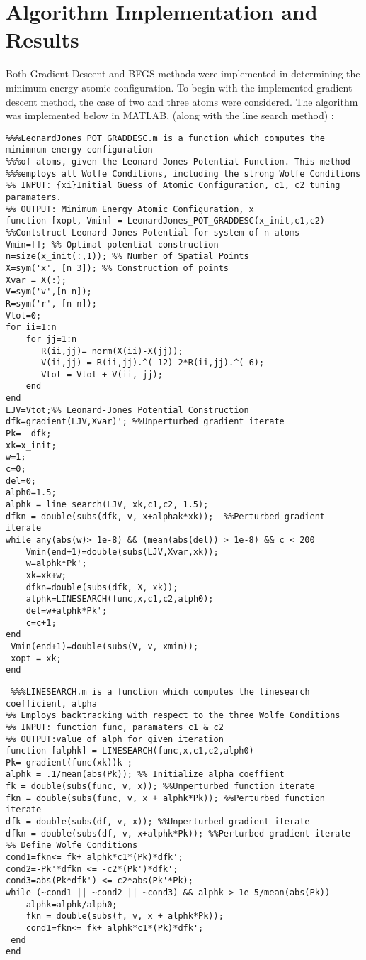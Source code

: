 \documentclass{article}
\begin{document}
 \section*{Algorithm Implementation and Results} 
Both Gradient Descent and BFGS methods were implemented  in determining the minimum energy atomic configuration. To begin with the implemented gradient descent method, the case of two and three atoms were considered. The algorithm was implemented below in MATLAB, (along with the line search method) : 
\begin{lstlisting}
%%%LeonardJones_POT_GRADDESC.m is a function which computes the minimnum energy configuration
%%%of atoms, given the Leonard Jones Potential Function. This method
%%%employs all Wolfe Conditions, including the strong Wolfe Conditions 
%% INPUT: {xi}Initial Guess of Atomic Configuration, c1, c2 tuning paramaters. 
%% OUTPUT: Minimum Energy Atomic Configuration, x
function [xopt, Vmin] = LeonardJones_POT_GRADDESC(x_init,c1,c2) 
%%Contstruct Leonard-Jones Potential for system of n atoms
Vmin=[]; %% Optimal potential construction 
n=size(x_init(:,1)); %% Number of Spatial Points 
X=sym('x', [n 3]); %% Construction of points 
Xvar = X(:); 
V=sym('v',[n n]); 
R=sym('r', [n n]);
Vtot=0; 
for ii=1:n 
    for jj=1:n  
       R(ii,jj)= norm(X(ii)-X(jj)); 
       V(ii,jj) = R(ii,jj).^(-12)-2*R(ii,jj).^(-6); 
       Vtot = Vtot + V(ii, jj);       
    end 
end 
LJV=Vtot;%% Leonard-Jones Potential Construction 
dfk=gradient(LJV,Xvar)'; %%Unperturbed gradient iterate
Pk= -dfk; 
xk=x_init;  
w=1; 
c=0; 
del=0;
alph0=1.5; 
alphk = line_search(LJV, xk,c1,c2, 1.5);
dfkn = double(subs(dfk, v, x+alphak*xk));  %%Perturbed gradient iterate
while any(abs(w)> 1e-8) && (mean(abs(del)) > 1e-8) && c < 200
    Vmin(end+1)=double(subs(LJV,Xvar,xk)); 
    w=alphk*Pk'; 
    xk=xk+w; 
    dfkn=double(subs(dfk, X, xk));
    alphk=LINESEARCH(func,x,c1,c2,alph0); 
    del=w+alphk*Pk'; 
    c=c+1; 
end
 Vmin(end+1)=double(subs(V, v, xmin));
 xopt = xk; 
end
 \end{lstlisting}
  \begin{lstlisting}
 %%%LINESEARCH.m is a function which computes the linesearch coefficient, alpha
%% Employs backtracking with respect to the three Wolfe Conditions 
%% INPUT: function func, paramaters c1 & c2 
%% OUTPUT:value of alph for given iteration
function [alphk] = LINESEARCH(func,x,c1,c2,alph0)
Pk=-gradient(func(xk))k ; 
alphk = .1/mean(abs(Pk)); %% Initialize alpha coeffient 
fk = double(subs(func, v, x)); %%Unperturbed function iterate
fkn = double(subs(func, v, x + alphk*Pk)); %%Perturbed function iterate
dfk = double(subs(df, v, x)); %%Unperturbed gradient iterate
dfkn = double(subs(df, v, x+alphk*Pk)); %%Perturbed gradient iterate
%% Define Wolfe Conditions 
cond1=fkn<= fk+ alphk*c1*(Pk)*dfk';  
cond2=-Pk'*dfkn <= -c2*(Pk')*dfk';  
cond3=abs(Pk*dfk') <= c2*abs(Pk'*Pk);  
while (~cond1 || ~cond2 || ~cond3) && alphk > 1e-5/mean(abs(Pk)) 
    alphk=alphk/alph0;
    fkn = double(subs(f, v, x + alphk*Pk));
    cond1=fkn<= fk+ alphk*c1*(Pk)*dfk'; 
 end 
end 
\end{lstlisting}
\end{document}
